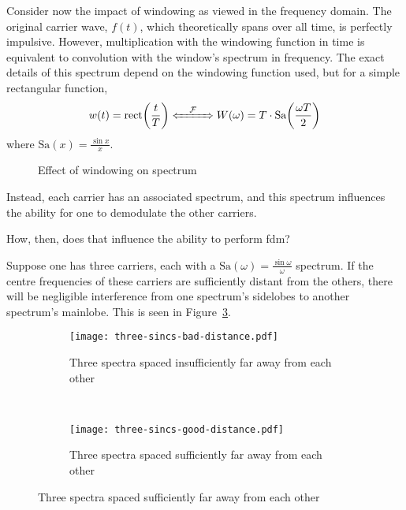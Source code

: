 \documentclass[class=report,11pt,crop=false]{standalone}
\begin{document}
Consider now the impact of windowing as viewed in the frequency domain. The original carrier wave, \(f(t)\), which theoretically spans over all time, is perfectly impulsive. However, multiplication with the windowing function in time is equivalent to convolution with the window's spectrum in frequency. The exact details of this spectrum depend on the windowing function used, but for a simple rectangular function,
\begin{equation}
    w(t) = \textrm{rect}\bigg(\frac{t}{T}\bigg) \xLeftrightarrow{\quad\mathcal{F}\quad} W(\omega) = T \cdot \textrm{Sa}\bigg(\frac{\omega T}{2}\bigg)
\end{equation}
where \(\textrm{Sa}(x)=\frac{\sin{x}}{x}\).

\begin{figure}[htbp]
    \centering
    \captionsetup{type=figure}
    \def\svgwidth{\linewidth}
    { %
        }
    \caption{Effect of windowing on spectrum}
    \label{fig:sampling-sine-freq}
\end{figure}

Instead, each carrier has an associated spectrum, and this spectrum influences the ability for one to demodulate the other carriers.

How, then, does that influence the ability to perform \gls{fdm}?

Suppose one has three carriers, each with a \(\textrm{Sa}(\omega) = \frac{\sin \omega}{\omega}\) spectrum. If the centre frequencies of these carriers are sufficiently distant from the others, there will be negligible interference from one spectrum's sidelobes to another spectrum's mainlobe. This is seen in Figure~\ref{fig:three-sincs-good-distance}.

\begin{figure}[htbp]
    \centering
    \captionsetup{type=figure}
    \begin{subfigure}[t]{0.45\textwidth}
        \centering
        \captionsetup{type=figure}
        \texttt{[image: three-sincs-bad-distance.pdf]}
        \caption{Three spectra spaced insufficiently far away from each other}
        \label{fig:three-sincs-bad-distance}
    \end{subfigure}%
    ~
    \begin{subfigure}[t]{0.545\textwidth}
        \centering
        \captionsetup{type=figure}
        \texttt{[image: three-sincs-good-distance.pdf]}
        \caption{Three spectra spaced sufficiently far away from each other}
        \label{fig:three-sincs-good-distance}
    \end{subfigure}
    \caption{Three spectra spaced sufficiently far away from each other}
    \label{fig:three-sincs-good-and-bad}
  \end{figure}
\end{document}
